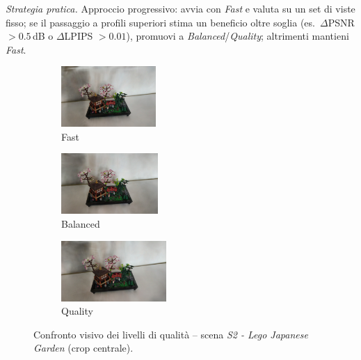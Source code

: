 \noindent\textit{Strategia pratica.} Approccio progressivo: avvia con \textit{Fast} e valuta su un set di viste fisso; se il passaggio a profili superiori stima un beneficio oltre soglia (es.\ $\Delta$PSNR $>0.5$\,dB o $\Delta$LPIPS $>0.01$), promuovi a \textit{Balanced}/\textit{Quality}; altrimenti mantieni \textit{Fast}.

\begin{figure}[H]
	\centering
	\begin{subfigure}{0.32\textwidth}
		\includegraphics[width=\linewidth, height=2.3cm, trim={80 40 80 40}, clip]{images/benchmarks/lego_japanese_garden_taming_fast.jpg}
		\caption{Fast}
	\end{subfigure}
	\hfill
	\begin{subfigure}{0.32\textwidth}
		\includegraphics[width=\linewidth, height=2.3cm, trim={80 40 80 40}, clip]{images/benchmarks/lego_japanese_garden_taming_balanced.jpg}
		\caption{Balanced}
	\end{subfigure}
	\hfill
	\begin{subfigure}{0.32\textwidth}
		\includegraphics[width=\linewidth, height=2.3cm, trim={80 40 80 40}, clip]{images/benchmarks/lego_japanese_garden_taming_quality.jpg}
		\caption{Quality}
	\end{subfigure}
	\caption{Confronto visivo dei livelli di qualit\`a -- scena \textit{S2 - Lego Japanese Garden} (crop centrale).}
	\label{fig:lego_japanese_garden_quality_comparison}
\end{figure}

